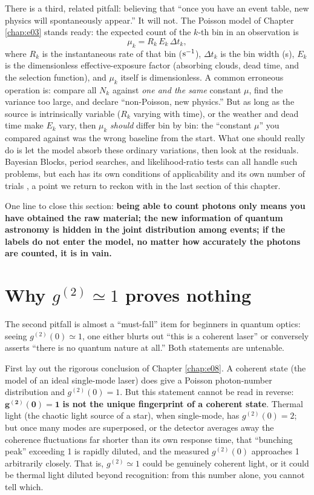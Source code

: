 There is a third, related pitfall: believing that ``once you have an event table, new physics will spontaneously appear.'' It will not. The Poisson model of Chapter \ref{chap:e03} stands ready: the expected count of the \(k\)-th bin in an observation is
\[
  \mu_k=R_k\,E_k\,\Delta t_k,
\]
where \(R_k\) is the instantaneous rate of that bin (\({\rm s}^{-1}\)), \(\Delta t_k\) is the bin width (s), \(E_k\) is the dimensionless effective-exposure factor (absorbing clouds, dead time, and the selection function), and \(\mu_k\) itself is dimensionless. A common erroneous operation is: compare all \(N_k\) against \emph{one and the same} constant \(\mu\), find the variance too large, and declare ``non-Poisson, new physics.'' But as long as the source is intrinsically variable (\(R_k\) varying with time), or the weather and dead time make \(E_k\) vary, then \(\mu_k\) \emph{should} differ bin by bin: the ``constant \(\mu\)'' you compared against was the wrong baseline from the start. What one should really do is let the model absorb these ordinary variations, then look at the residuals. Bayesian Blocks, period searches, and likelihood-ratio tests can all handle such problems, but each has its own conditions of applicability and its own number of trials \citep{2013ApJ...764..167S,1982ApJ...263..835S,1992ApJ...398..146G,2002ApJ...571..545P}, a point we return to reckon with in the last section of this chapter.

One line to close this section: \textbf{being able to count photons only means you have obtained the raw material; the new information of quantum astronomy is hidden in the joint distribution among events; if the labels do not enter the model, no matter how accurately the photons are counted, it is in vain.}


\section{\texorpdfstring{Why \(g^{(2)}\simeq1\) proves nothing}{Why g2 approximately equal to 1 proves nothing}}
\label{sec:e27-g2}

The second pitfall is almost a ``must-fall'' item for beginners in quantum optics: seeing \(g^{(2)}(0)\simeq1\), one either blurts out ``this is a coherent laser'' or conversely asserts ``there is no quantum nature at all.'' Both statements are untenable.

First lay out the rigorous conclusion of Chapter \ref{chap:e08}. A coherent state (the model of an ideal single-mode laser) does give a Poisson photon-number distribution and \(g^{(2)}(0)=1\). But this statement cannot be read in reverse: \(\mathbf{g^{(2)}(0)=1}\) \textbf{is not the unique fingerprint of a coherent state}. Thermal light (the chaotic light source of a star), when single-mode, has \(g^{(2)}(0)=2\); but once many modes are superposed, or the detector averages away the coherence fluctuations far shorter than its own response time, that ``bunching peak'' exceeding 1 is rapidly diluted, and the measured \(g^{(2)}(0)\) approaches 1 arbitrarily closely. That is, \(g^{(2)}\simeq1\) could be genuinely coherent light, or it could be thermal light diluted beyond recognition: from this number alone, you cannot tell which.

